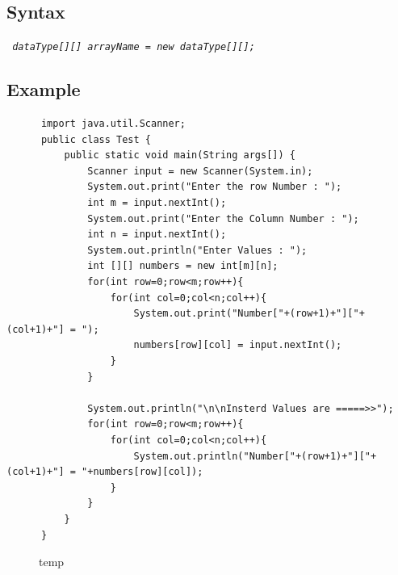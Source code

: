 \documentclass[openany]{book}  %
\begin{document}
\subsection{Syntax}
\begin{center}
    \tt{
        \textit{dataType[][] arrayName = new dataType[][];}
    }
\end{center}

% 
%
\subsection{Example}
\begin{center}
    \footnotesize
    \begin{verbatim}
      import java.util.Scanner;
      public class Test {
          public static void main(String args[]) {
              Scanner input = new Scanner(System.in);
              System.out.print("Enter the row Number : ");
              int m = input.nextInt();
              System.out.print("Enter the Column Number : ");
              int n = input.nextInt();
              System.out.println("Enter Values : ");
              int [][] numbers = new int[m][n];
              for(int row=0;row<m;row++){
                  for(int col=0;col<n;col++){
                      System.out.print("Number["+(row+1)+"]["+(col+1)+"] = ");
                      numbers[row][col] = input.nextInt();
                  }
              }

              System.out.println("\n\nInsterd Values are =====>>");
              for(int row=0;row<m;row++){
                  for(int col=0;col<n;col++){
                      System.out.println("Number["+(row+1)+"]["+(col+1)+"] = "+numbers[row][col]);
                  }
              }
          }
      }
    \end{verbatim}
\end{center}
% 
% 
\begin{figure}[htbp]
    \begin{center}
        \caption{temp\cite{Ref3}}
    \end{center}
\end{figure}
% 
% 
\end{document}
